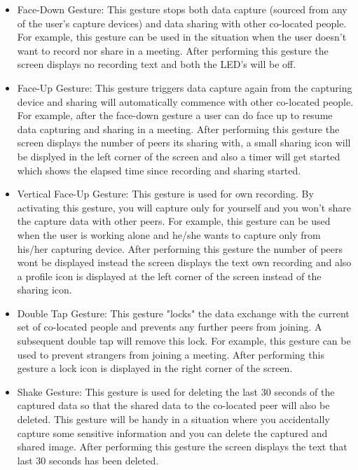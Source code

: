 \documentclass[mscthesis]{usiinfthesis}
\begin{document}
\begin{itemize}
  \item Face-Down Gesture: This gesture stops both data capture (sourced from any of the user's capture devices) and data sharing with other co-located people. For example, this gesture can be used in the situation when the user doesn't want to record nor share in a meeting. After performing this gesture the screen displays no recording text and both the LED's will be off. 
  \item Face-Up Gesture: This gesture triggers data capture again from the capturing device and sharing will automatically commence with other co-located people. For example, after the face-down gesture a user can do face up to resume data capturing and sharing in a meeting. After performing this gesture the screen displays the number of peers its sharing with, a small sharing icon will be displyed in the left corner of the screen and also a timer will get started which shows the elapsed time since recording and sharing started. 
  \item Vertical Face-Up Gesture: This gesture is used for own recording. By activating this gesture, you will capture only for yourself and you won't share the capture data with other peers. For example, this gesture can be used when the user is working alone and he/she wants to capture only from his/her capturing device. After performing this gesture the number of peers wont be displayed instead the screen displays the text own recording and also a profile icon is displayed at the left corner of the screen instead of the sharing icon.
  \item Double Tap Gesture: This gesture "locks" the data exchange with the current set of co-located people and prevents any further peers from joining. A subsequent double tap will remove this lock. For example, this gesture can be used to prevent strangers from joining a meeting. After performing this gesture a lock icon is displayed in the right corner of the screen. 
  \item Shake Gesture: This gesture is used for deleting the last 30 seconds of the captured data so that the shared data to the co-located peer will also be deleted. This gesture will be handy in a situation where you accidentally capture some sensitive information and you can delete the captured and shared image. After performing this gesture the screen displays the text that last 30 seconds has been deleted.
\end{itemize}
\end{document}
